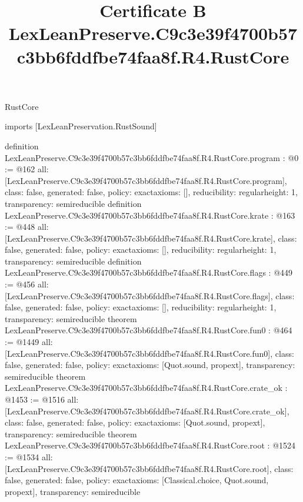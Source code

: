 \begin{lexlean}{RustCore}
\title{Certificate B LexLeanPreserve.C9c3e39f4700b57c3bb6fddfbe74faa8f.R4.RustCore}
\begin{coremodule}
imports [LexLeanPreservation.RustSound]

definition LexLeanPreserve.C9c3e39f4700b57c3bb6fddfbe74faa8f.R4.RustCore.program : @0 := @162 {
  all: [LexLeanPreserve.C9c3e39f4700b57c3bb6fddfbe74faa8f.R4.RustCore.program],
  class: false,
  generated: false,
  policy: exact{axioms: []},
  reducibility: regular{height: 1},
  transparency: semireducible
}
definition LexLeanPreserve.C9c3e39f4700b57c3bb6fddfbe74faa8f.R4.RustCore.krate : @163 := @448 {
  all: [LexLeanPreserve.C9c3e39f4700b57c3bb6fddfbe74faa8f.R4.RustCore.krate],
  class: false,
  generated: false,
  policy: exact{axioms: []},
  reducibility: regular{height: 1},
  transparency: semireducible
}
definition LexLeanPreserve.C9c3e39f4700b57c3bb6fddfbe74faa8f.R4.RustCore.flags : @449 := @456 {
  all: [LexLeanPreserve.C9c3e39f4700b57c3bb6fddfbe74faa8f.R4.RustCore.flags],
  class: false,
  generated: false,
  policy: exact{axioms: []},
  reducibility: regular{height: 1},
  transparency: semireducible
}
theorem LexLeanPreserve.C9c3e39f4700b57c3bb6fddfbe74faa8f.R4.RustCore.fun0 : @464 := @1449 {
  all: [LexLeanPreserve.C9c3e39f4700b57c3bb6fddfbe74faa8f.R4.RustCore.fun0],
  class: false,
  generated: false,
  policy: exact{axioms: [Quot.sound, propext]},
  transparency: semireducible
}
theorem LexLeanPreserve.C9c3e39f4700b57c3bb6fddfbe74faa8f.R4.RustCore.crate_ok : @1453 := @1516 {
  all: [LexLeanPreserve.C9c3e39f4700b57c3bb6fddfbe74faa8f.R4.RustCore.crate_ok],
  class: false,
  generated: false,
  policy: exact{axioms: [Quot.sound, propext]},
  transparency: semireducible
}
theorem LexLeanPreserve.C9c3e39f4700b57c3bb6fddfbe74faa8f.R4.RustCore.root : @1524 := @1534 {
  all: [LexLeanPreserve.C9c3e39f4700b57c3bb6fddfbe74faa8f.R4.RustCore.root],
  class: false,
  generated: false,
  policy: exact{axioms: [Classical.choice, Quot.sound, propext]},
  transparency: semireducible
}


\end{coremodule}
\end{lexlean}
